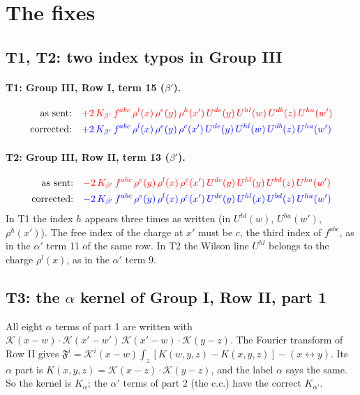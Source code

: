 \documentclass[10pt]{article}
\numberwithin{equation}{section}
\newcommand{\KK}{\mathcal K}
\begin{document}
\section{The fixes}\label{sec:fixes}
\subsection{T1, T2: two index typos in Group III}
\paragraph{T1: Group III, Row I, term 15 ($\beta'$).}
\begin{align*}
\text{as sent:}\quad&\textcolor{red}{+2\,K_{\beta'}\,f^{abc}\,\rho^{l}(x)\,\rho^{e}(y)\,\rho^{h}(x')\,U^{de}(y)\,U^{hl}(w)\,U^{db}(z)\,U^{ha}(w')}\\
\text{corrected:}\quad&\textcolor{blue}{+2\,K_{\beta'}\,f^{abc}\,\rho^{l}(x)\,\rho^{e}(y)\,\rho^{c}(x')\,U^{de}(y)\,U^{hl}(w)\,U^{db}(z)\,U^{ha}(w')}
\end{align*}
\paragraph{T2: Group III, Row II, term 13 ($\beta'$).}
\begin{align*}
\text{as sent:}\quad&\textcolor{red}{-2\,K_{\beta'}\,f^{abc}\,\rho^{e}(y)\,\rho^{l}(x)\,\rho^{c}(x')\,U^{de}(y)\,U^{hl}(y)\,U^{bd}(z)\,U^{ha}(w')}\\
\text{corrected:}\quad&\textcolor{blue}{-2\,K_{\beta'}\,f^{abc}\,\rho^{e}(y)\,\rho^{l}(x)\,\rho^{c}(x')\,U^{de}(y)\,U^{hl}(x)\,U^{bd}(z)\,U^{ha}(w')}
\end{align*}
In T1 the index $h$ appears three times as written (in $U^{hl}(w)$, $U^{ha}(w')$, $\rho^h(x')$). The free index of the charge at $x'$ must be $c$, the third index of $f^{abc}$, as in the $\alpha'$ term 11 of the same row. In T2 the Wilson line $U^{hl}$ belongs to the charge $\rho^l(x)$, as in the $\alpha'$ term 9.

\subsection{T3: the \texorpdfstring{$\alpha$}{alpha} kernel of Group I, Row II, part 1}
All eight $\alpha$ terms of part 1 are written with $\KK(x-w)\cdot\KK(x'-w')\,\KK(x'-w)\cdot\KK(y-z)$. The Fourier transform of Row II gives $\mathfrak F^i=\KK^i(x-w)\int_z[K(w,y,z)-K(x,y,z)]-(x\leftrightarrow y)$. Its $\alpha$ part is $K(x,y,z)=\KK(x-z)\cdot\KK(y-z)$, and the label $\alpha$ says the same. So the kernel is $K_\alpha$; the $\alpha'$ terms of part 2 (the c.c.) have the correct $K_{\alpha'}$.
\end{document}
